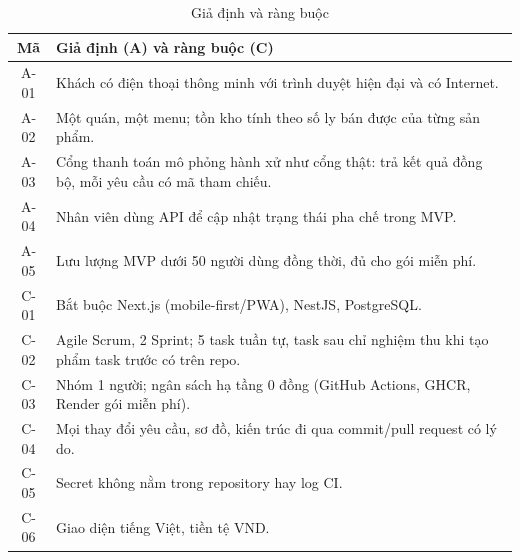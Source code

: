 \documentclass[a4paper]{article}
\begin{document}
\begin{table}[H]
\centering\small
\begin{tabular}{|c|L{13.6cm}|}
\hline
\textbf{Mã} & \textbf{Giả định (A) và ràng buộc (C)} \\ \hline
A-01 & Khách có điện thoại thông minh với trình duyệt hiện đại và có Internet. \\ \hline
A-02 & Một quán, một menu; tồn kho tính theo số ly bán được của từng sản phẩm. \\ \hline
A-03 & Cổng thanh toán mô phỏng hành xử như cổng thật: trả kết quả đồng bộ, mỗi yêu cầu có mã tham chiếu. \\ \hline
A-04 & Nhân viên dùng API để cập nhật trạng thái pha chế trong MVP. \\ \hline
A-05 & Lưu lượng MVP dưới 50 người dùng đồng thời, đủ cho gói miễn phí. \\ \hline
C-01 & Bắt buộc Next.js (mobile-first/PWA), NestJS, PostgreSQL. \\ \hline
C-02 & Agile Scrum, 2 Sprint; 5 task tuần tự, task sau chỉ nghiệm thu khi tạo phẩm task trước có trên repo. \\ \hline
C-03 & Nhóm 1 người; ngân sách hạ tầng 0 đồng (GitHub Actions, GHCR, Render gói miễn phí). \\ \hline
C-04 & Mọi thay đổi yêu cầu, sơ đồ, kiến trúc đi qua commit/pull request có lý do. \\ \hline
C-05 & Secret không nằm trong repository hay log CI. \\ \hline
C-06 & Giao diện tiếng Việt, tiền tệ VND. \\ \hline
\end{tabular}
\caption{Giả định và ràng buộc}
\end{table}
\end{document}
